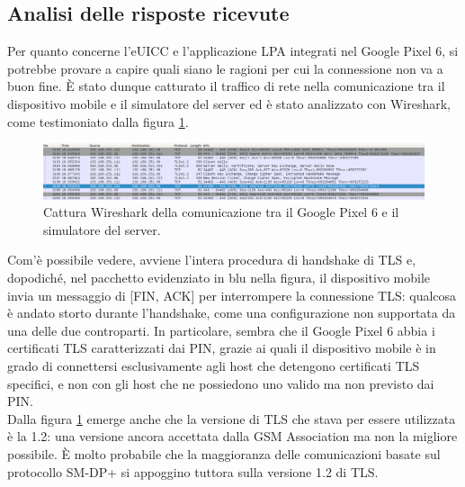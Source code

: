 \documentclass[10pt, oneside]{book}
\begin{document}
\subsection{Analisi delle risposte ricevute}
Per quanto concerne l'eUICC e l'applicazione LPA integrati nel Google Pixel 6, si potrebbe provare a capire quali siano le ragioni per cui la connessione non va a buon fine. È stato dunque catturato il traffico di rete nella comunicazione tra il dispositivo mobile e il simulatore del server ed è stato analizzato con Wireshark, come testimoniato dalla figura \ref{fig:wireshark-pixel}.
\begin{figure}
\includegraphics[width=\linewidth]{wireshark-pixel.png}
\caption{Cattura Wireshark della comunicazione tra il Google Pixel 6 e il simulatore del server.}
\label{fig:wireshark-pixel}
\end{figure}
Com'è possibile vedere, avviene l'intera procedura di handshake di TLS e, dopodiché, nel pacchetto evidenziato in blu nella figura, il dispositivo mobile invia un messaggio di [FIN, ACK] per interrompere la connessione TLS: qualcosa è andato storto durante l'handshake, come una configurazione non supportata da una delle due controparti. In particolare, sembra che il Google Pixel 6 abbia i certificati TLS caratterizzati dai PIN, grazie ai quali il dispositivo mobile è in grado di connettersi esclusivamente agli host che detengono certificati TLS specifici, e non con gli host che ne possiedono uno valido ma non previsto dai PIN.\\
Dalla figura \ref{fig:wireshark-pixel} emerge anche che la versione di TLS che stava per essere utilizzata è la 1.2: una versione ancora accettata dalla GSM Association ma non la migliore possibile. È molto probabile che la maggioranza delle comunicazioni basate sul protocollo SM-DP+ si appoggino tuttora sulla versione 1.2 di TLS.\\
\end{document}
